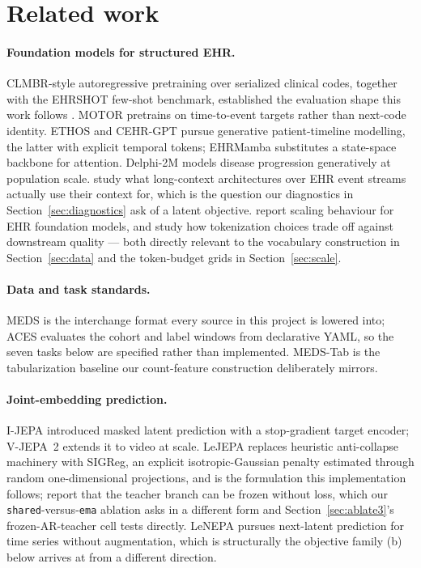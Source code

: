 \documentclass[11pt,a4paper]{article}
\newcommand{\code}[1]{\texttt{\small #1}}
\begin{document}
\section{Related work}
\label{sec:related}

\paragraph{Foundation models for structured EHR.}
CLMBR-style autoregressive pretraining over serialized clinical codes, together
with the EHRSHOT few-shot benchmark, established the evaluation shape this work
follows \citep{ehrshot}. MOTOR \citep{motor} pretrains on time-to-event
targets rather than next-code identity. ETHOS \citep{ethos} and CEHR-GPT
\citep{cehrgpt} pursue generative patient-timeline modelling, the latter with
explicit temporal tokens; EHRMamba \citep{ehrmamba} substitutes a state-space
backbone for attention. Delphi-2M \citep{delphi2m} models disease progression
generatively at population scale. \citet{contextclues} study what long-context
architectures over EHR event streams actually use their context for, which is
the question our diagnostics in Section~\ref{sec:diagnostics} ask of a latent
objective. \citet{ehrscaling} report scaling behaviour for EHR foundation
models, and \citet{tokenization} study how tokenization choices trade off
against downstream quality --- both directly relevant to the vocabulary
construction in Section~\ref{sec:data} and the token-budget grids in
Section~\ref{sec:scale}.

\paragraph{Data and task standards.}
MEDS \citep{meds} is the interchange format every source in this project is
lowered into; ACES \citep{aces} evaluates the cohort and label windows from
declarative YAML, so the seven tasks below are specified rather than
implemented. MEDS-Tab \citep{medstab} is the tabularization baseline our
count-feature construction deliberately mirrors.

\paragraph{Joint-embedding prediction.}
I-JEPA \citep{ijepa} introduced masked latent prediction with a stop-gradient
target encoder; V-JEPA~2 \citep{vjepa2} extends it to video at scale. LeJEPA
\citep{lejepa} replaces heuristic anti-collapse machinery with SIGReg, an
explicit isotropic-Gaussian penalty estimated through random one-dimensional
projections, and is the formulation this implementation follows;
\citet{salt} report that the teacher branch can be frozen without loss, which
our \code{shared}-versus-\code{ema} ablation asks in a different form and
Section~\ref{sec:ablate3}'s frozen-AR-teacher cell tests directly. LeNEPA
\citep{lenepa} pursues next-latent prediction for time
series without augmentation, which is structurally the objective family
(b) below arrives at from a different direction.
\end{document}
